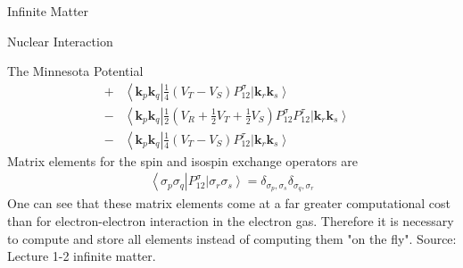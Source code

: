 \documentclass[twoside,english]{uiofysmaster}
\begin{document}
\begin{chapter}{Infinite Matter}
\begin{section}{Nuclear Interaction}
\begin{subsection}{The Minnesota Potential}
\begin{align}
				+&\left<\mathbf{k}_p \mathbf{k}_q \right| \frac{1}{4} (V_T - V_S) P_{12}^\sigma \left| \mathbf{k}_r \mathbf{k}_s \right> \\
				-&\left<\mathbf{k}_p \mathbf{k}_q \right| \frac{1}{2} \left( V_R + \frac{1}{2} V_T + \frac{1}{2} V_S \right) P_{12}^\sigma P_{12}^\tau \left| \mathbf{k}_r \mathbf{k}_s \right> \\
				-&\left<\mathbf{k}_p \mathbf{k}_q \right| \frac{1}{4}(V_T - V_S) P_{12}^\tau  \left| \mathbf{k}_r \mathbf{k}_s \right>&
			\end{align}
			Matrix elements for the spin and isospin exchange operators are 
			\begin{align}
				\left< \sigma_p \sigma_q \right| P_{12}^\sigma \left| \sigma_r \sigma_s \right> = \delta_{\sigma_p,\sigma_s} \delta_{\sigma_q,\sigma_r}
			\end{align}
			One can see that these matrix elements come at a far greater computational cost than for electron-electron interaction in the electron gas. Therefore it is necessary to compute and store all elements instead of computing them "on the fly". Source: Lecture 1-2 infinite matter. 
		\end{subsection}
		
	\end{section}
\end{chapter}
\end{document}
